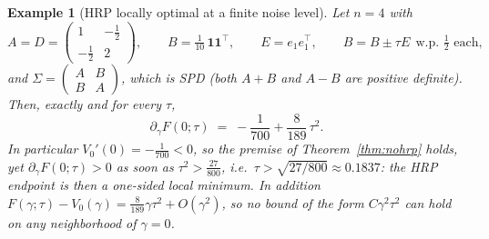 \documentclass[11pt]{article}
\newtheorem{example}{Example}
\theoremstyle{remark}
\begin{document}
\begin{example}[HRP locally optimal at a finite noise level]
\label{ex:boundary}
Let $n = 4$ with
\[
  A = D = \begin{pmatrix} 1 & -\tfrac12 \\ -\tfrac12 & 2 \end{pmatrix},
  \qquad
  B = \tfrac{1}{10}\,\mathbf{1}\mathbf{1}^\top,
  \qquad
  E = e_1 e_1^\top,
  \qquad
  \widehat B = B \pm \tau E \ \ \text{w.p. } \tfrac12 \text{ each},
\]
and $\Sigma = \left(\begin{smallmatrix} A & B \\ B & A
\end{smallmatrix}\right)$, which is SPD (both $A + B$ and $A - B$ are
positive definite). Then, exactly and for every $\tau$,
\begin{equation}
  \partial_\gamma F(0; \tau) \;=\; -\frac{1}{700} + \frac{8}{189}\,\tau^2 .
  \label{eq:boundaryderiv}
\end{equation}
In particular $V_0'(0) = -\tfrac{1}{700} < 0$, so the premise of
Theorem~\ref{thm:nohrp} holds, yet $\partial_\gamma F(0;\tau) > 0$ as soon
as $\tau^2 > \tfrac{27}{800}$, i.e.\ $\tau > \sqrt{27/800} \approx 0.1837$:
the HRP endpoint is then a one-sided local minimum. In addition
$F(\gamma;\tau) - V_0(\gamma) = \tfrac{8}{189}\gamma\tau^2 + O(\gamma^2)$,
so no bound of the form $C\gamma^2\tau^2$ can hold on any neighborhood of
$\gamma = 0$.
\end{example}
\end{document}
